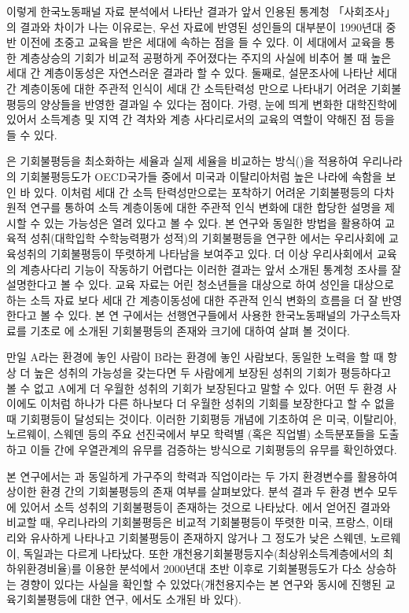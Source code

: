 이렇게 한국노동패널 자료 분석에서 나타난 결과가 앞서 인용된 통계청 「사회조사」의 결과와 차이가 나는 이유로는, 우선 자료에 반영된 성인들의 대부분이 1990년대 중반 이전에 초중고 교육을 받은 세대에 속하는 점을 들 수 있다. 이 세대에서 교육을 통한 계층상승의 기회가 비교적 공평하게 주어졌다는 주지의 사실에 비추어 볼 때 높은 세대 간 계층이동성은 자연스러운 결과라 할 수 있다. 둘째로, 설문조사에 나타난 세대 간 계층이동에 대한 주관적 인식이 세대 간 소득탄력성 만으로 나타내기 어려운 기회불평등의 양상들을 반영한 결과일 수 있다는 점이다. 가령, 눈에 띄게 변화한 대학진학에 있어서 소득계층 및 지역 간 격차와 계층 사다리로서의 교육의 역할이 약해진 점 등을 들 수 있다.

\citet{knl08}은 기회불평등을 최소화하는 세율과 실제 세율을 비교하는 방식(\citet{retl03})을 적용하여 우리나라의 기회불평등도가 OECD국가들 중에서 미국과 이탈리아처럼 높은 나라에 속함을 보인 바 있다.
이처럼 세대 간 소득 탄력성만으로는 포착하기 어려운 기회불평등의 다차원적 연구를 통하여 소득 계층이동에 대한 주관적 인식 변화에 대한 합당한 설명을 제시할 수 있는 가능성은 열려 있다고 볼 수 있다.  
본 연구와 동일한 방법을 활용하여 교육적 성취(대학입학 수학능력평가 성적)의 기회불평등을 연구한 \citet{ohetl16}에서는 우리사회에 교육성취의 기회불평등이 뚜렷하게 나타남을 보여주고 있다.
더 이상 우리사회에서 교육의 계층사다리 기능이 작동하기 어렵다는 이러한 결과는 앞서 소개된 통계청 조사를 잘 설명한다고 볼 수 있다.
교육 자료는 어린 청소년들을 대상으로 하여 성인을 대상으로 하는 소득 자료 보다 세대 간 계층이동성에 대한 주관적 인식 변화의 흐름을 더 잘 반영한다고 볼 수 있다.
 본 연 구에서는 선행연구들에서 사용한 한국노동패널의 가구소득자료를 기초로 \citet{letl08, letl09}에 소개된 기회불평등의 존재와 크기에 대하여 살펴 볼 것이다.
 
 만일 A라는 환경에 놓인 사람이 B라는 환경에 놓인 사람보다, 동일한 노력을 할 때 항상 더 높은 성취의 가능성을 갖는다면 두 사람에게 보장된 성취의 기회가 평등하다고 볼 수 없고 A에게 더 우월한 성취의 기회가 보장된다고 말할 수 있다.
 어떤 두 환경 사이에도 이처럼 하나가 다른 하나보다 더 우월한 성취의 기회를 보장한다고 할 수 없을 때 기회평등이 달성되는 것이다.
 이러한 기회평등 개념에 기초하여 \citet{letl08, letl09}은 미국, 이탈리아, 노르웨이, 스웨덴 등의 주요 선진국에서 부모 학력별 (혹은 직업별) 소득분포들을 도출하고 이들 간에 우열관계의 유무를 검증하는 방식으로 기회평등의 유무를 확인하였다.

본 연구에서는 \citeauthor{letl08}과 동일하게 가구주의 학력과 직업이라는 두 가지 환경변수를 활용하여 상이한 환경 간의 기회불평등의 존재 여부를 살펴보았다.
 분석 결과 두 환경 변수 모두에 있어서 소득 성취의 기회불평등이 존재하는 것으로 나타났다.
 \citet{letl08, letl09}에서 얻어진 결과와 비교할 때, 우리나라의 기회불평등은 비교적 기회불평등이 뚜렷한 미국, 프랑스, 이태리와 유사하게 나타나고 기회불평등이 존재하지 않거나 그 정도가 낮은 스웨덴, 노르웨이, 독일과는 다르게 나타났다.
 또한 개천용기회불평등지수(최상위소득계층에서의 최하위환경비율)를 이용한 분석에서 2000년대 초반 이후로 기회불평등도가 다소 상승하는 경향이 있다는 사실을 확인할 수 있었다(개천용지수는 본 연구와 동시에 진행된 교육기회불평등에 대한 연구, \citet{ohetl16}에서도 소개된 바 있다).
 
